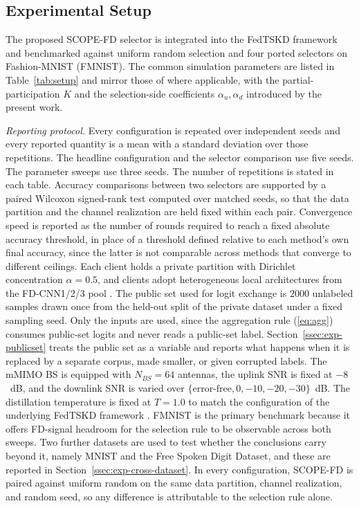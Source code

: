 \documentclass[journal]{IEEEtran}
\newcommand{\rev}[1]{#1}
\begin{document}
\subsection{Experimental Setup}
\label{ssec:exp-setup}

The proposed SCOPE-FD selector is integrated into the FedTSKD framework \cite{mu2024fedtskd} and benchmarked against uniform random selection and four ported selectors on Fashion-MNIST (FMNIST). The common simulation parameters are listed in Table~\ref{tab:setup} and mirror those of \cite{mu2024fedtskd} where applicable, with the partial-participation $K$ and the selection-side coefficients $\alpha_u, \alpha_d$ introduced by the present work.

\rev{\textit{Reporting protocol.} Every configuration is repeated over independent seeds and every reported quantity is a mean with a standard deviation over those repetitions. The headline configuration and the selector comparison use five seeds. The parameter sweeps use three seeds. The number of repetitions is stated in each table. Accuracy comparisons between two selectors are supported by a paired Wilcoxon signed-rank test computed over matched seeds, so that the data partition and the channel realization are held fixed within each pair. Convergence speed is reported as the number of rounds required to reach a fixed absolute accuracy threshold, in place of a threshold defined relative to each method's own final accuracy, since the latter is not comparable across methods that converge to different ceilings.} Each client holds a private partition with Dirichlet concentration $\alpha = 0.5$, and clients adopt heterogeneous local architectures from the FD-CNN1/2/3 pool \cite{chan2021fedhe}. \rev{The public set used for logit exchange \cite{itahara2023distillation} is $2000$ unlabeled samples drawn once from the held-out split of the private dataset under a fixed sampling seed. Only the inputs are used, since the aggregation rule (\ref{eq:agg}) consumes public-set logits and never reads a public-set label. Section~\ref{ssec:exp-publicset} treats the public set as a variable and reports what happens when it is replaced by a separate corpus, made smaller, or given corrupted labels.} The mMIMO BS is equipped with $N_{BS} = 64$ antennas, the uplink SNR is fixed at $-8$~dB, and the downlink SNR is varied over $\{\text{error-free}, 0, -10, -20, -30\}$~dB. The distillation temperature is fixed at $T = 1.0$ to match the configuration of the underlying FedTSKD framework \cite{mu2024fedtskd}.%
FMNIST is the primary benchmark because it offers FD-signal headroom for the selection rule to be observable across both sweeps. \rev{Two further datasets are used to test whether the conclusions carry beyond it, namely MNIST and the Free Spoken Digit Dataset, and these are reported in Section~\ref{ssec:exp-cross-dataset}.}
In every configuration, SCOPE-FD is paired against uniform random on the same data partition, channel realization, and random seed, so any difference is attributable to the selection rule alone. %
\end{document}
